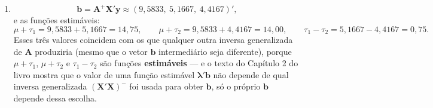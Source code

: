 \documentclass[11pt]{article}
\begin{document}
\begin{solucao}
\begin{enumerate}[label=(\alph*)]
\begin{lstlisting}
A <- matrix(c(4,2,2, 2,2,0, 2,0,2), ncol = 3, byrow = TRUE)
sv <- svd(A)
D_mais <- diag(ifelse(sv$d > 1e-8, 1 / sv$d, 0))
A_mais <- sv$v %*% D_mais %*% t(sv$u)
max(abs(A_mais - MASS::ginv(A)))
\end{lstlisting}
  Rodando o código, a diferença máxima é numericamente zero: a construção manual via SVD e
  \texttt{MASS::ginv()} produzem a mesma matriz.
  \item
  $$
  \mathbf{b} = \mathbf{A}^+\mathbf{X}'\mathbf{y} \approx (9{,}5833,\ 5{,}1667,\ 4{,}4167)',
  $$
  e as funções estimáveis:
  $$
  \mu+\tau_1 = 9{,}5833+5{,}1667 = 14{,}75, \qquad \mu+\tau_2 = 9{,}5833+4{,}4167 = 14{,}00,
  \qquad \tau_1-\tau_2 = 5{,}1667-4{,}4167 = 0{,}75.
  $$
  Esses três valores coincidem com os que qualquer outra inversa generalizada de $\mathbf{A}$
  produziria (mesmo que o vetor $\mathbf{b}$ intermediário seja diferente), porque
  $\mu+\tau_1$, $\mu+\tau_2$ e $\tau_1-\tau_2$ são funções \textbf{estimáveis} --- e o texto do
  Capítulo 2 do livro mostra que o valor de uma função estimável $\boldsymbol\lambda'\mathbf{b}$
  não depende de qual inversa generalizada $(\mathbf{X}'\mathbf{X})^-$ foi usada para obter
  $\mathbf{b}$, só o próprio $\mathbf{b}$ depende dessa escolha.
\end{enumerate}
\end{solucao}
\end{document}

